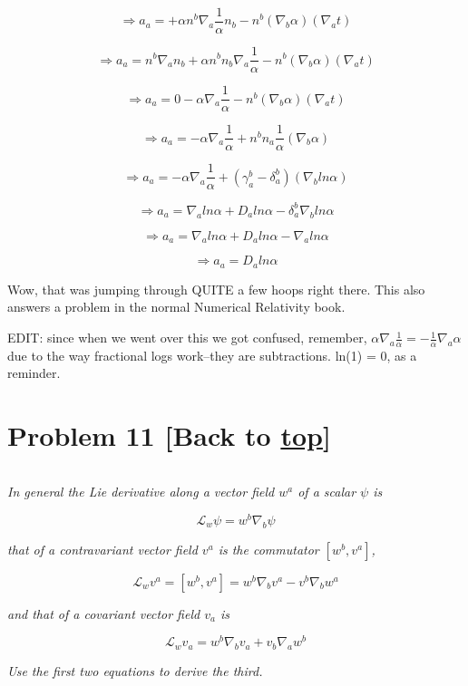 \documentclass[landscape,letterpaper,10pt,english]{article}
\begin{document}
\[ \Rightarrow a_a = + \alpha n^b \nabla_a \frac1\alpha n_b - n^b (\nabla_b \alpha) (\nabla_a t)   \]

\[ \Rightarrow a_a = n^b \nabla_a n_b + \alpha n^b n_b \nabla_a \frac1\alpha - n^b (\nabla_b \alpha) (\nabla_a t)   \]

\[ \Rightarrow a_a = 0 - \alpha \nabla_a \frac1\alpha - n^b (\nabla_b \alpha) (\nabla_a t)   \]

\[ \Rightarrow a_a = - \alpha \nabla_a \frac1\alpha + n^b n_a \frac1\alpha (\nabla_b \alpha)    \]

\[ \Rightarrow a_a = - \alpha \nabla_a \frac1\alpha + (\gamma^b_a - \delta^b_a) (\nabla_b ln \alpha)    \]

\[ \Rightarrow a_a = \nabla_a ln\alpha + D_a ln\alpha - \delta^b_a \nabla_b ln \alpha    \]

\[ \Rightarrow a_a = \nabla_a ln\alpha + D_a ln\alpha - \nabla_a ln \alpha    \]

\[ \Rightarrow a_a = D_a ln\alpha \]

Wow, that was jumping through QUITE a few hoops right there. This also
answers a problem in the normal Numerical Relativity book.

EDIT: since when we went over this we got confused, remember,
\(\alpha \nabla_a \frac1\alpha = - \frac1\alpha \nabla_a \alpha\) due to
the way fractional logs work--they are subtractions. ln(1) = 0, as a
reminder.

    \hypertarget{problem-11-back-to-top}{%
\section{\texorpdfstring{Problem 11 {[}Back to
\hyperref[toc]{top}{]}}{Problem 11 {[}Back to {]}}}\label{problem-11-back-to-top}}

\[\label{P11}\]

\emph{In general the Lie derivative along a vector field \(w^a\) of a
scalar \(\psi\) is}

\[ \mathcal{L}_w \psi = w^b \nabla_b \psi \]

\emph{that of a contravariant vector field \(v^a\) is the commutator
\([w^b,v^a]\),}

\[ \mathcal{L}_w v^a = [w^b,v^a] = w^b \nabla_b v^a - v^b \nabla_b w^a \]

\emph{and that of a covariant vector field \(v_a\) is}

\[ \mathcal{L}_w v_a = w^b \nabla_b v_a + v_b \nabla_a w^b \]

\emph{Use the first two equations to derive the third.}
\end{document}
